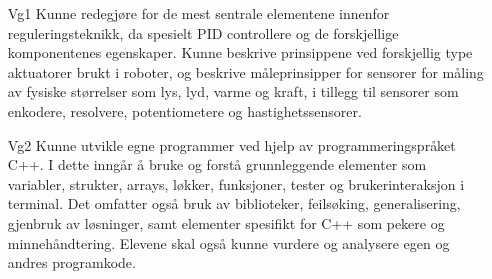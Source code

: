 		\begin{itemize}

			\item[Vg1] Kunne redegjøre for de mest sentrale elementene innenfor reguleringsteknikk, da spesielt PID controllere og de forskjellige komponentenes egenskaper. Kunne beskrive prinsippene ved forskjellig type aktuatorer brukt i roboter, og beskrive måleprinsipper for sensorer for måling av fysiske størrelser som lys, lyd, varme og kraft, i tillegg til sensorer som enkodere, resolvere, potentiometere og hastighetssensorer.
			\item[Vg2] Kunne utvikle egne programmer ved hjelp av programmeringspråket C++. I dette inngår å bruke og forstå grunnleggende elementer som variabler, strukter, arrays, løkker, funksjoner, tester og brukerinteraksjon i terminal. Det omfatter også bruk av biblioteker, feilsøking, generalisering, gjenbruk av løsninger, samt elementer spesifikt for C++ som pekere og minnehåndtering. Elevene skal også kunne vurdere og analysere egen og andres programkode.

		\end{itemize}


\iffalse

\begin{itemize}
	\item redegjøre for de mest sentrale elementene innenfor reguleringsteknikk, da spesielt PID controllere og de forskjellige komponentenes egenskaper
	\item beskrive prinsippene ved forskjellig type aktuatorer brukt i roboter
	\item beskrive måleprinsipper for sensorer for måling av fysiske størrelser som lys, lyd, varme, kraft
	\item beskrive måleprinsipper for interne sensorer som enkodere, resolvere, potentiometere, hastighetssensorer
\end{itemize}

\fi
